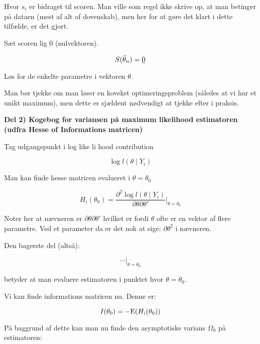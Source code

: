 Hvor $s_i$ er bidraget til scoren. Man ville som regel ikke skrive op, at man betinger på dataen (mest af alt af dovenskab), men her for at gøre det klart i dette tilfælde, er det gjort.

Sæt scoren lig $\underbar{0}$ (nulvektoren).

\begin{equation}
    S(\hat{\theta}_n) = \underbar{0}
\end{equation}

Løs for de enkelte parametre i vektoren $\theta$.

Man bør tjekke om man løser en kovekst optimeringsproblem (således at vi har et unikt maximum), men dette er sjældent nødvendigt at tjekke efter i praksis.


\textbf{Del 2) Kogebog for variansen på maximum likelihood estimatoren (udfra Hesse of Informations matricen)}

Tag udgangspunkt i log like li hood contribution

\begin{equation}
\log l (\theta \mid Y_i)
\end{equation}

Man kan finde hesse matricen evalueret i $\theta = \theta_0$

\begin{equation}
    H_i (\theta_0) = \frac{\partial^2 \log l(\theta \mid Y_i)}{\partial \theta \partial \theta'} \bigg \vert_{\theta = \theta_0}
\end{equation}

Noter her at nævneren er $\partial \theta \partial \theta'$ hvilket er fordi $\theta$ ofte er en vektor af flere parametre. Ved et parameter da er det nok at sige: $\partial \theta^2$ i nævneren.

Den bagerste del (altså):

\begin{equation}
    \cdots \bigg \vert_{\theta = \theta_0}
\end{equation}

betyder at man evaluere estimatoren i punktet hvor $\theta = \theta_0$.

Vi kan finde informations matricen nu. Denne er:

\begin{equation}
    I(\theta_0) = - \text{E}(H_i(\theta_0))
\end{equation}

På baggrund af dette kan man nu finde den asymptotiske varians $\Omega_0$ på estimatoren:

